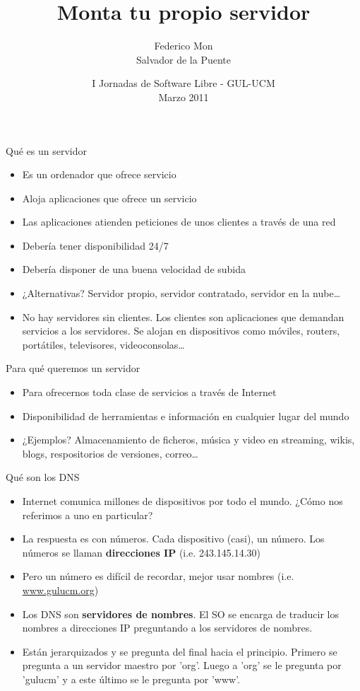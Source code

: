 \documentclass[spanish]{beamer}
\title[Monta tu propio servidor - GUL-UCM]
{Monta tu propio servidor
}
\author[\url{http://gulucm.org}]
{
Federico Mon\\
Salvador de la Puente
}
\institute{Facultad de Informática.\\Universidad Complutense de Madrid.}
\date{
I Jornadas de Software Libre - GUL-UCM\\
Marzo 2011}
\begin{document}
\frame{\titlepage}

\begin{frame}{Qué es un servidor}
\begin{itemize}
\item Es un ordenador que ofrece servicio
\item Aloja aplicaciones que ofrece un servicio
\item Las aplicaciones atienden peticiones de unos clientes a través de una red
\item Debería tener disponibilidad 24/7
\item Debería disponer de una buena velocidad de subida
\item ¿Alternativas? Servidor propio, servidor contratado, servidor en la nube\ldots
\item No hay servidores sin clientes. Los clientes son aplicaciones que demandan servicios a los servidores. Se alojan en dispositivos como móviles, routers, portátiles, televisores, videoconsolas\ldots
\end{itemize}
\end{frame}

\begin{frame}{Para qué queremos un servidor}
\begin{itemize}
\item Para ofrecernos toda clase de servicios a través de Internet
\item Disponibilidad de herramientas e información en cualquier lugar del mundo
\item ¿Ejemplos? Almacenamiento de ficheros, música y video en streaming, wikis, blogs, respositorios de versiones, correo\ldots
\end{itemize}
\end{frame}

\begin{frame}{Qué son los DNS}
\begin{itemize}
\item Internet comunica millones de dispositivos por todo el mundo. ¿Cómo nos referimos a uno en particular?
\item La respuesta es con números. Cada dispositivo (casi), un número. Los números se llaman {\bf direcciones IP} (i.e. 243.145.14.30)
\item Pero un número es difícil de recordar, mejor usar nombres (i.e. \url{www.gulucm.org})
\item Los DNS son {\bf servidores de nombres}. El SO se encarga de traducir los nombres a direcciones IP preguntando a los servidores de nombres.
\item Están jerarquizados y se pregunta del final hacia el principio. Primero se pregunta a un servidor maestro por 'org'. Luego a 'org' se le pregunta por 'gulucm' y a este último se le pregunta por 'www'.
\end{itemize}
\end{frame}
\end{document}

